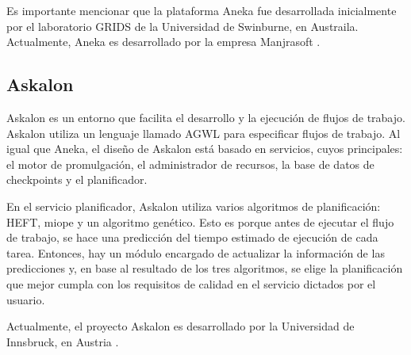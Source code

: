 Es importante mencionar que la plataforma Aneka fue desarrollada inicialmente por el laboratorio GRIDS de la Universidad de Swinburne, en Austraila. Actualmente, Aneka es desarrollado por la empresa Manjrasoft \cite{aneka2014webpage}.

\subsection{Askalon}

Askalon \cite{fahringer2005askalon} es un entorno que facilita el desarrollo y la ejecución de flujos de trabajo. Askalon utiliza un lenguaje llamado AGWL para especificar flujos de trabajo. Al igual que Aneka, el diseño de Askalon está basado en servicios, cuyos principales: el motor de promulgación, el administrador de recursos, la base de datos de checkpoints y el planificador.

En el servicio planificador, Askalon utiliza varios algoritmos de planificación: HEFT, miope y un algoritmo genético. Esto es porque antes de ejecutar el flujo de trabajo, se hace una predicción del tiempo estimado de ejecución de cada tarea. Entonces, hay un módulo encargado de actualizar la información de las predicciones y, en base al resultado de los tres algoritmos, se elige la planificación que mejor cumpla con los requisitos de calidad en el servicio dictados por el usuario.

Actualmente, el proyecto Askalon es desarrollado por la Universidad de Innsbruck, en Austria \cite{askalon2014webpage}.